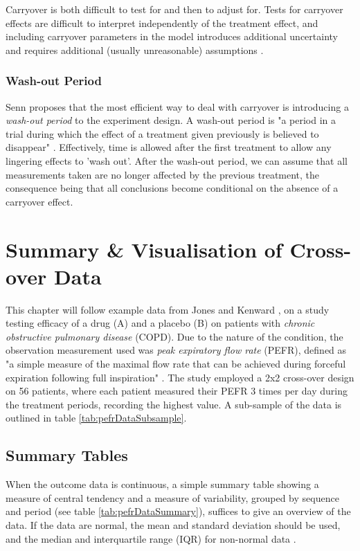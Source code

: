 \documentclass[12pt, TexShade, letterpaper]{report}
\begin{document}
Carryover is both difficult to test for and then to adjust for. Tests for carryover effects are difficult to interpret independently of the treatment effect, and including carryover parameters in the model introduces additional uncertainty and requires additional (usually unreasonable) assumptions \cite{senn2002crossover}.

\subsection{Wash-out Period}
Senn \cite{senn2002crossover} proposes that the most efficient way to deal with carryover is introducing a \textit{wash-out period} to the experiment design. A wash-out period is "a period in a trial during which the effect of a treatment given previously is believed to disappear" \cite{senn2002crossover}. Effectively, time is allowed after the first treatment to allow any lingering effects to 'wash out'. After the wash-out period, we can assume that all measurements taken are no longer affected by the previous treatment, the consequence being that all conclusions become conditional on the absence of a carryover effect.

\chapter{Summary \& Visualisation of Cross-over Data} \label{visualisation}
This chapter will follow example data from Jones and Kenward \cite{jones2003design}, on a study testing efficacy of a drug (A) and a placebo (B) on patients with \textit{chronic obstructive pulmonary disease} (COPD). Due to the nature of the condition, the observation measurement used was \textit{peak expiratory flow rate} (PEFR), defined as "a simple measure of the maximal flow rate that can be achieved during forceful expiration following full inspiration" \cite{peakflowrate2023}. The study employed a 2x2 cross-over design on 56 patients, where each patient measured their PEFR 3 times per day during the treatment periods, recording the highest value. A sub-sample of the data is outlined in table \ref{tab:pefrDataSubsample}.


\section{Summary Tables}
When the outcome data is continuous, a simple summary table showing a measure of central tendency and a measure of variability, grouped by sequence and period (see table \ref{tab:pefrDataSummary}), suffices to give an overview of the data. If the data are normal, the mean and standard deviation should be used, and the median and interquartile range (IQR) for non-normal data \cite{vetter2017descriptive}.
\end{document}
